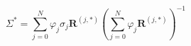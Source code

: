     \begin{equation}
        \Sigma^* = \sum_{j=0}^N \varphi_j\sigma_j\mathbf{R}^{(j, \ast)} \left(\sum_{j=0}^N \varphi_j\mathbf{R}^{(j,\ast)}\right)^{-1}
    \label{eq:emt_solving_b}
    \end{equation}
